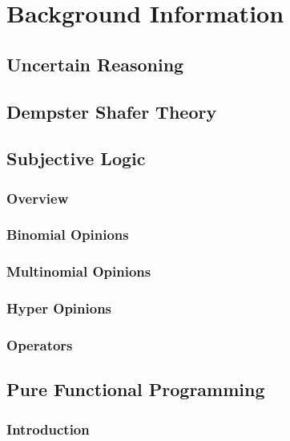 \documentclass[thesis.tex]{subfiles}
\begin{document}
\chapter{Background Information}



\section{Uncertain Reasoning}


\section{Dempster Shafer Theory}




\section{Subjective Logic}

\subsection{Overview}

\subsection{Binomial Opinions}

\subsection{Multinomial Opinions}

\subsection{Hyper Opinions}

\subsection{Operators}






\section{Pure Functional Programming}

\subsection{Introduction}
\end{document}

